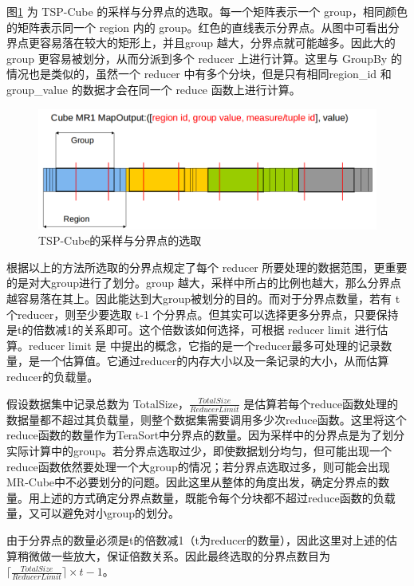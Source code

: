 图\ref{tscube_picture} 为 TSP-Cube 的采样与分界点的选取。每一个矩阵表示一个 group，相同颜色的矩阵表示同一个 region 内的 group。红色的直线表示分界点。从图中可看出分界点更容易落在较大的矩形上，并且group 越大，分界点就可能越多。因此大的 group 更容易被划分，从而分派到多个 reducer 上进行计算。这里与 GroupBy 的情况也是类似的，虽然一个 reducer 中有多个分块，但是只有相同region\_id 和 group\_value 的数据才会在同一个 reduce 函数上进行计算。

\begin{figure}[!htb] 
\centering\includegraphics[width=6in]{picture/ch_terasort_mr/tscube_picture} 
\caption{TSP-Cube的采样与分界点的选取}\label{tscube_picture} 
\end{figure}

根据以上的方法所选取的分界点规定了每个 reducer 所要处理的数据范围，更重要的是对大group进行了划分。group 越大，采样中所占的比例也越大，那么分界点越容易落在其上。因此能达到大group被划分的目的。而对于分界点数量，若有 t 个reducer，则至少要选取 t-1 个分界点。但其实可以选择更多分界点，只要保持是t的倍数减1的关系即可。这个倍数该如何选择，可根据 reducer limit 进行估算。reducer limit 是 \cite{nandi2011distributed} 中提出的概念，它指的是一个reducer最多可处理的记录数量，是一个估算值。它通过reducer的内存大小以及一条记录的大小，从而估算reducer的负载量。

假设数据集中记录总数为 TotalSize，$\frac{TotalSize}{ReducerLimit}$ 是估算若每个reduce函数处理的数据量都不超过其负载量，则整个数据集需要调用多少次reduce函数。这里将这个reduce函数的数量作为TeraSort中分界点的数量。因为采样中的分界点是为了划分实际计算中的group。若分界点选取过少，即使数据划分均匀，但可能出现一个reduce函数依然要处理一个大group的情况；若分界点选取过多，则可能会出现MR-Cube中不必要划分的问题。因此这里从整体的角度出发，确定分界点的数量。用上述的方式确定分界点数量，既能令每个分块都不超过reduce函数的负载量，又可以避免对小group的划分。

由于分界点的数量必须是t的倍数减1（t为reducer的数量），因此这里对上述的估算稍微做一些放大，保证倍数关系。因此最终选取的分界点数目为$\lceil \frac{TotalSize}{ReducerLimit} \rceil \times t -1 $。

